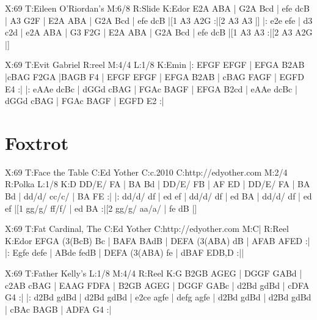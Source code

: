 \documentclass[letterpaper]{article}
\begin{document}
\begin{abc}[name]
X:69
T:Eileen O'Riordan's
M:6/8
R:Slide
K:Edor
E2A ABA | G2A Bcd | efe dcB | A3 G2F |
E2A ABA | G2A Bcd | efe dcB |[1 A3 A2G :|[2 A3 A3 |]
|: e2e efe | d3 c2d | e2A ABA | G3 F2G |
E2A ABA | G2A Bcd | efe dcB |[1 A3 A3 :|[2 A3 A2G |]
\end{abc}

\begin{abc}[name]
X:69
T:Evit Gabriel
R:reel
M:4/4
L:1/8
K:Emin
|: EFGF EFGF | EFGA B2AB |cBAG F2GA |BAGB F4 |
EFGF EFGF | EFGA B2AB | cBAG FAGF | EGFD E4 :|
|: eAAe dcBc | dGGd cBAG | FGAc BAGF | EFGA B2cd |
eAAe dcBc | dGGd cBAG | FGAc BAGF | EGFD E2 :|
\end{abc}

\section{Foxtrot}

\begin{abc}[name]
X:69
T:Face the Table
C:Ed Yother
C:c.2010
C:http://edyother.com
M:2/4
R:Polka
L:1/8
K:D
DD/E/ FA | BA Bd | DD/E/ FB | AF ED |
DD/E/ FA | BA Bd | dd/d/ cc/c/ | BA FE :|
|: dd/d/ df | ed ef | dd/d/ df | ed BA |
dd/d/ df | ed ef |[1 gg/g/ ff/f/ | ed BA :|[2 gg/g/ aa/a/ | fe dB |]
\end{abc}

\begin{abc}[name]
X:69
T:Fat Cardinal, The
C:Ed Yother
C:http://edyother.com
M:C|
R:Reel
K:Edor
EFGA (3(BcB) Bc | BAFA BAdB | DEFA (3(ABA) dB | AFAB AFED :|
|: Egfe defe | ABde fedB | DEFA (3(ABA) fe | dBAF EDB,D :||
\end{abc}

\begin{abc}[name]
X:69
T:Father Kelly's
L:1/8
M:4/4
R:Reel
K:G
B2GB AGEG | DGGF GABd | c2AB cBAG | EAAG FDFA |
B2GB AGEG | DGGF GABc | d2Bd gdBd | cDFA G4 :|
|: d2Bd gdBd | d2Bd gdBd | e2ce agfe | defg agfe |
d2Bd gdBd | d2Bd gdBd | cBAc BAGB | ADFA G4 :|
\end{abc}
\end{document}
